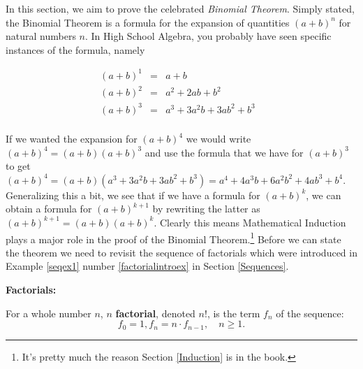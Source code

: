 \documentclass{ximera}
\begin{document}
	\author{Stitz-Zeager}




\setcounter{footnote}{0}

\label{Binomial}

In this section, we aim to prove the celebrated \textit{Binomial Theorem}.  Simply stated, the Binomial Theorem is a formula for the expansion of quantities $(a+b)^n$ for natural numbers $n$.  In High School Algebra, you probably have seen specific instances of the formula, namely

\[ \begin{array}{rclr}

(a+b)^1 & = & a + b & \\
(a+b)^2 & = & a^2 + 2ab + b^2 & \\
(a+b)^3 & = & a^3 + 3a^2 b + 3ab^2 + b^3 & \\
\end{array}\]

If we wanted the expansion for $(a+b)^4$ we would write $(a+b)^4 = (a+b)(a+b)^3$ and use the formula that we have for $(a+b)^3$ to get $(a+b)^4 = (a+b) \left( a^3 + 3a^2 b + 3ab^2 + b^3 \right) = a^4 + 4a^3b + 6a^2b^2 + 4ab^3 + b^4$.  Generalizing this a bit, we see that if we have a formula for $(a+b)^{k}$, we can obtain a formula for $(a+b)^{k+1}$ by rewriting the latter as $(a+b)^{k+1} = (a+b)(a+b)^{k}$.  Clearly this means Mathematical Induction plays a major role in the proof of the Binomial Theorem.\footnote{It's pretty much the reason Section \ref{Induction} is in the book.}  Before we can state the theorem we need to revisit the sequence of factorials which were introduced in Example \ref{seqex1} number \ref{factorialintroex} in Section \ref{Sequences}.

\medskip


\begin{definition}  \label{factorialdefn}  \textbf{Factorials:}  

For a whole number $n$,  {\boldmath $n$} \textbf{factorial}, denoted $n!$,  is the term $f_{n}$ of the sequence: \[ f_{0} = 1, f_{n} =n \cdot f_{n-1}, \quad n \geq 1.\]


\end{definition}



\medskip
\end{document}

